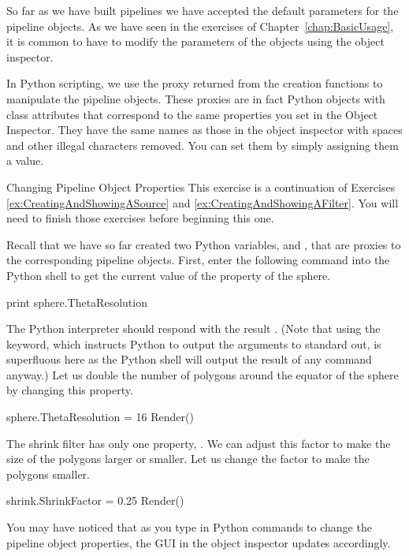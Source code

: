 So far as we have built pipelines we have accepted the default parameters
for the pipeline objects.  As we have seen in the exercises of
Chapter~\ref{chap:BasicUsage}, it is common to have to modify the
parameters of the objects using the object inspector.

In Python scripting, we use the proxy returned from the creation functions
to manipulate the pipeline objects.  These proxies are in fact Python
objects with class attributes that correspond to the same properties you
set in the Object Inspector.  They have the same names as those in the
object inspector with spaces and other illegal characters removed.  You can
set them by simply assigning them a value.

\begin{exercise}{Changing Pipeline Object Properties}
  \label{ex:ChangingPipelineObjectProperties}%
  This exercise is a continuation of Exercises
  \ref{ex:CreatingAndShowingASource} and
  \ref{ex:CreatingAndShowingAFilter}.  You will need to finish those
  exercises before beginning this one.

  Recall that we have so far created two Python variables, 
  and , that are proxies to the corresponding pipeline
  objects.  First, enter the following command into the Python shell to get
  the current value of the  property of the sphere.

  \begin{python}
print sphere.ThetaResolution
  \end{python}

  The Python interpreter should respond with the result .  (Note
  that using the  keyword, which instructs Python to output
  the arguments to standard out, is superfluous here as the Python shell
  will output the result of any command anyway.)  Let us double the number
  of polygons around the equator of the sphere by changing this property.

  \begin{python}
sphere.ThetaResolution = 16
Render()
  \end{python}

  The shrink filter has only one property, .  We can
  adjust this factor to make the size of the polygons larger or smaller.
  Let us change the factor to make the polygons smaller.

  \begin{python}
shrink.ShrinkFactor = 0.25
Render()
  \end{python}

  You may have noticed that as you type in Python commands to change the
  pipeline object properties, the GUI in the object inspector updates
  accordingly.
\end{exercise}

